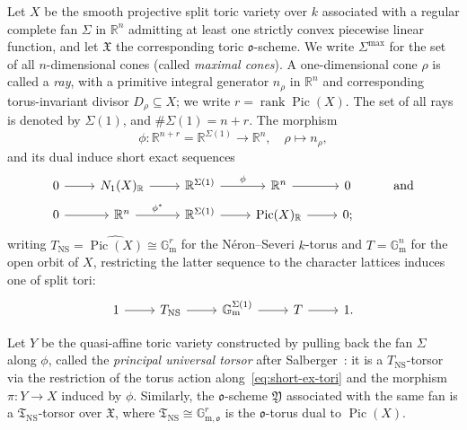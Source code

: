 \documentclass[a4paper, twoside, 11pt]{amsart}
\theoremstyle{definition}
\newcommand{\mT}{\mathfrak{T}}
\newcommand{\mX}{\mathfrak{X}}
\newcommand{\mY}{\mathfrak{Y}}
\newcommand{\fo}{\mathfrak{o}}
\newcommand{\RR}{\mathbb{R}}
\newcommand{\Gm}{\mathbb{G}_\mathrm{m}}
\newcommand{\Gmok}{\mathbb{G}_{\mathrm{m},\mathfrak{o}}}
\DeclareMathOperator{\Pic}{Pic}
\newcommand{\NS}{\mathrm{NS}}
\begin{document}
	Let $X$ be the smooth projective split toric variety over $k$ associated with a regular complete fan $\Sigma$ in $\RR^n$ admitting at least one strictly convex piecewise linear function,
    and let $\mX$ the corresponding toric $\fo$-scheme. 
    We write $\Sigma^{\max}$ for the set of all $n$-dimensional cones (called \emph{maximal cones}). A one-dimensional cone $\rho$ is called a \emph{ray}, with a primitive integral generator $n_\rho$ in $\RR^n$ and corresponding torus-invariant divisor $D_\rho \subseteq X$;  we write $r=\operatorname{rank}\operatorname{Pic}(X)$. The set of all rays is denoted by $\Sigma(1)$, and $\#\Sigma(1)=n+r$. 
	The morphism
	\begin{equation*}
		\phi\colon \RR^{n+r} = \RR^{\Sigma(1)}\to \RR^n,\quad \rho\mapsto n_\rho,
	\end{equation*}
	and its dual induce short exact sequences
	\begin{equation}\label{eq:lattice-sequences}
		\begin{tikzcd}[row sep = tiny]
			0 \ar[r] & N_1(X)_\RR \ar[r] & \RR^{\Sigma(1)} \ar[r, "\phi"] & \RR^n \ar[r]& 0 & \text{and} \\
			0 \ar[r] & \RR^n\ar[r,"\phi^*"] & \RR^{\Sigma(1)} \ar[r] & \Pic(X)_\RR \ar[r] & 0;
		\end{tikzcd}
	\end{equation}
	writing $T_\NS = \widehat{\Pic(X)}\cong \Gm^r$ for the Néron--Severi $k$-torus and $T = \Gm^n$ for the open orbit of $X$, restricting the latter sequence to the character lattices induces one of split tori:
	\begin{equation}\label{eq:short-ex-tori}
		\begin{tikzcd}
			1\ar[r] & T_\NS \ar[r]& \Gm^{\Sigma(1)} \ar[r] & T \ar[r]& 1.
		\end{tikzcd}
	\end{equation}

	Let $Y$ be the quasi-affine toric variety constructed by pulling back the fan $\Sigma$ along $\phi$, called the \emph{principal universal torsor} after Salberger~\cite{Salberger}: it is a $T_\NS$-torsor via the restriction of the torus action along~\eqref{eq:short-ex-tori} and the morphism $\pi\colon Y\to X$ induced by $\phi$. Similarly, the $\fo$-scheme $\mY$ associated with the same fan is a $\mT_\NS$-torsor over $\mX$, where $\mT_\NS\cong \Gmok^r$ is the $\fo$-torus dual to $\Pic(X)$.
\end{document}
